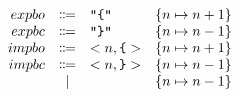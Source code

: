 \begin{align*}
  \begin{array}{rcll}
    {expbo}
    & \Coloneq & \text{\texttt{\textquotedbl\{\textquotedbl}} &\{n \mapsto n + 1\} \\
    {expbc}
    & \Coloneq & \text{\texttt{\textquotedbl\}\textquotedbl}} &\{n \mapsto n - 1\} \\
    {impbo}
    & \Coloneq & <n, \text{\texttt{\{}}> &\{n \mapsto n + 1\} \\
    {impbc}
    & \Coloneq & <n, \text{\texttt{\}}}> &\{n \mapsto n - 1\} \\
    & \mid & &\{n \mapsto n - 1\}
  \end{array}
\end{align*}
